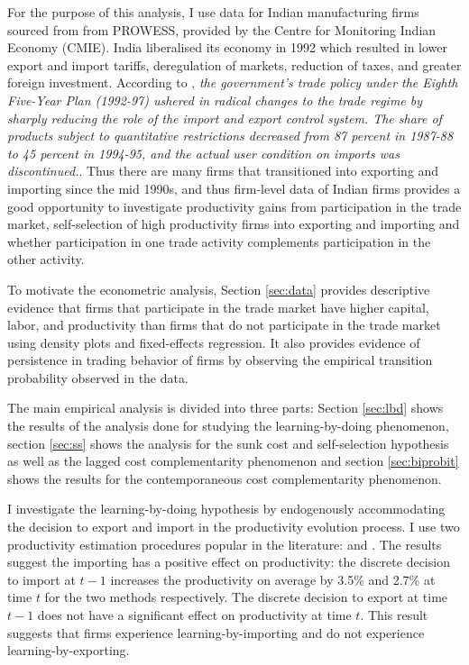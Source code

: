 \documentclass[12pt]{article}
\begin{document}
For the purpose of this analysis, I use data for Indian manufacturing
firms sourced from from PROWESS, provided by the Centre for Monitoring
Indian Economy (CMIE). India liberalised its economy in
1992 which resulted in lower export and import
tariffs, deregulation of markets, reduction of taxes, and greater 
foreign investment. According to \textcite{topalova2011trade}, \textit{the government's trade policy under the Eighth Five-Year Plan (1992-97) ushered
in radical changes to the trade regime by sharply reducing the role of
the import and export control system. The share of products subject to quantitative restrictions
decreased from 87 percent in 1987-88 to 45 percent in 1994-95, and the actual user
condition on imports was discontinued.}. Thus there are many firms
that transitioned into exporting and importing since the mid 1990s, and thus
firm-level data of Indian firms provides a good opportunity to
investigate  productivity gains from participation in
the trade market, self-selection of high productivity firms into
exporting and importing and 
whether participation in one trade activity complements participation
in the other activity.

To motivate the econometric analysis, Section \ref{sec:data} provides descriptive evidence that firms that
participate in the trade market have higher capital, labor, and
productivity than firms that do not participate in the trade
market using density plots and fixed-effects regression. It also provides evidence of persistence in trading
behavior of firms by observing the empirical transition probability observed in
the data. 

The main empirical analysis is divided into three parts: Section
\ref{sec:lbd} shows the results of the analysis done for studying the
learning-by-doing phenomenon, section \ref{sec:ss} shows the
analysis for the sunk cost and
self-selection hypothesis as well as the lagged cost complementarity
phenomenon and section \ref{sec:biprobit} shows the results for the
contemporaneous cost complementarity phenomenon.

I investigate the learning-by-doing hypothesis by endogenously
accommodating the decision to export and import in the
productivity evolution process. I use two productivity estimation
procedures popular in the literature:
\textcite{levinsohn2003estimating} and
\textcite{ackerberg2006structural}. The results suggest the importing
has a positive effect on productivity: the discrete decision to import
at $t-1$
increases the productivity on average by 3.5\% and 2.7\% at time $t$ for the two
methods respectively. The discrete decision to export at time $t-1$
does not have a significant effect on
productivity at time $t$. This result suggests that firms experience
learning-by-importing and do not experience learning-by-exporting. 
\end{document}
